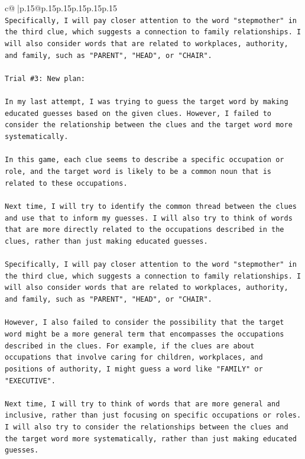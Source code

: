 \documentclass{article}
\begin{document}
{\begin{supertabular}{c@{$\;$}|p{.15\linewidth}@{}p{.15\linewidth}p{.15\linewidth}p{.15\linewidth}p{.15\linewidth}p{.15\linewidth}}
{{{\\ 
\texttt{Specifically, I will pay closer attention to the word "stepmother" in the third clue, which suggests a connection to family relationships. I will also consider words that are related to workplaces, authority, and family, such as "PARENT", "HEAD", or "CHAIR".} \\
\\ 
\texttt{Trial \#3: New plan: } \\
\\ 
\texttt{In my last attempt, I was trying to guess the target word by making educated guesses based on the given clues. However, I failed to consider the relationship between the clues and the target word more systematically. } \\
\\ 
\texttt{In this game, each clue seems to describe a specific occupation or role, and the target word is likely to be a common noun that is related to these occupations. } \\
\\ 
\texttt{Next time, I will try to identify the common thread between the clues and use that to inform my guesses. I will also try to think of words that are more directly related to the occupations described in the clues, rather than just making educated guesses. } \\
\\ 
\texttt{Specifically, I will pay closer attention to the word "stepmother" in the third clue, which suggests a connection to family relationships. I will also consider words that are related to workplaces, authority, and family, such as "PARENT", "HEAD", or "CHAIR". } \\
\\ 
\texttt{However, I also failed to consider the possibility that the target word might be a more general term that encompasses the occupations described in the clues. For example, if the clues are about occupations that involve caring for children, workplaces, and positions of authority, I might guess a word like "FAMILY" or "EXECUTIVE". } \\
\\ 
\texttt{Next time, I will try to think of words that are more general and inclusive, rather than just focusing on specific occupations or roles. I will also try to consider the relationships between the clues and the target word more systematically, rather than just making educated guesses.} \\
\\ 
}}}
\end{supertabular}}
\end{document}
